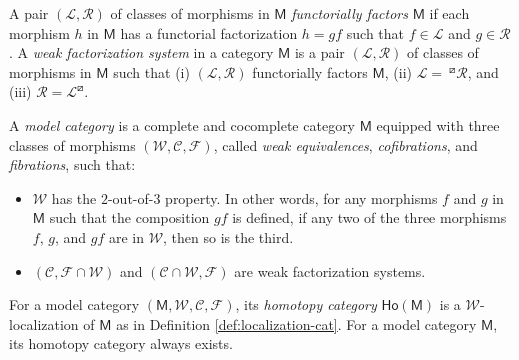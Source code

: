 \documentclass{amsbook}
\numberwithin{section}{chapter}
\numberwithin{subsection}{section}
\numberwithin{equation}{section}
\theoremstyle{plain}
\theoremstyle{definition}
\newcommand{\calc}{\mathcal{C}}
\newcommand{\calf}{\mathcal{F}}
\newcommand{\call}{\mathcal{L}}
\newcommand{\calr}{\mathcal{R}}
\newcommand{\calw}{\mathcal{W}}
\newcommand{\M}{\mathsf{M}}
\newcommand{\Ho}{\mathsf{Ho}}
\begin{document}
A pair $(\call,\calr)$ of classes of morphisms in $\M$ \emph{functorially factors} $\M$ if each morphism $h$ in $\M$ has a functorial factorization $h=gf$ such that $f \in \call$ and $g \in \calr$.  A \emph{weak factorization system} in a category $\M$ is a pair $(\call,\calr)$ of classes of morphisms in $\M$ such that (i) $(\call,\calr)$ functorially factors $\M$, (ii) $\call = \> {}^{\boxslash}\!\calr$, and (iii) $\calr = \call^{\boxslash}$.

A \emph{model category} is a complete and cocomplete category $\M$ equipped with three classes of morphisms\label{notation:wcf} $(\calw, \calc,\calf)$, called \emph{weak equivalences}, \emph{cofibrations}, and \emph{fibrations}, such that:
\begin{itemize} \item $\calw$ has the $2$-out-of-$3$ property.  In other words, for any morphisms $f$ and $g$ in $\M$ such that the composition $gf$ is defined, if any two of the three morphisms $f$, $g$, and $gf$ are in $\calw$, then so is the third.
\item $(\calc, \calf \cap \calw)$ and $(\calc \cap \calw,\calf)$ are weak factorization systems.\end{itemize}
For a model category $(\M,\calw,\calc,\calf)$, its \emph{homotopy category}\label{notation:homotopy-cat} $\Ho(\M)$ is a $\calw$-localization of $\M$ as in Definition \ref{def:localization-cat}.  For a model category $\M$, its homotopy category always exists.
\end{document}
